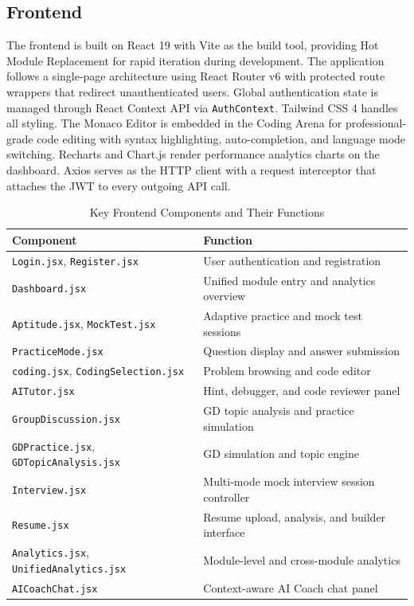 \documentclass[12pt,a4paper]{report}
\begin{document}
\subsection{Frontend}

The frontend is built on React 19 with Vite as the build tool, providing Hot Module Replacement for rapid iteration during development. The application follows a single-page architecture using React Router v6 with protected route wrappers that redirect unauthenticated users. Global authentication state is managed through React Context API via \texttt{AuthContext}. Tailwind CSS 4 handles all styling. The Monaco Editor is embedded in the Coding Arena for professional-grade code editing with syntax highlighting, auto-completion, and language mode switching. Recharts and Chart.js render performance analytics charts on the dashboard. Axios serves as the HTTP client with a request interceptor that attaches the JWT to every outgoing API call.

\begin{table}[H]
    \centering
    \caption{Key Frontend Components and Their Functions}
    \label{tab:frontend}
    \begin{tabular}{|l|l|}
        \hline
        \textbf{Component} & \textbf{Function} \\
        \hline
        \texttt{Login.jsx}, \texttt{Register.jsx} & User authentication and registration \\
        \texttt{Dashboard.jsx} & Unified module entry and analytics overview \\
        \texttt{Aptitude.jsx}, \texttt{MockTest.jsx} & Adaptive practice and mock test sessions \\
        \texttt{PracticeMode.jsx} & Question display and answer submission \\
        \texttt{coding.jsx}, \texttt{CodingSelection.jsx} & Problem browsing and code editor \\
        \texttt{AITutor.jsx} & Hint, debugger, and code reviewer panel \\
        \texttt{GroupDiscussion.jsx} & GD topic analysis and practice simulation \\
        \texttt{GDPractice.jsx}, \texttt{GDTopicAnalysis.jsx} & GD simulation and topic engine \\
        \texttt{Interview.jsx} & Multi-mode mock interview session controller \\
        \texttt{Resume.jsx} & Resume upload, analysis, and builder interface \\
        \texttt{Analytics.jsx}, \texttt{UnifiedAnalytics.jsx} & Module-level and cross-module analytics \\
        \texttt{AICoachChat.jsx} & Context-aware AI Coach chat panel \\
        \hline
    \end{tabular}
\end{table}
\end{document}
